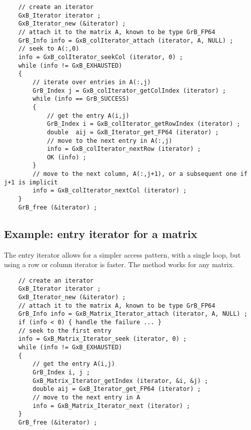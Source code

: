 \documentclass[12pt]{article}
\begin{document}
    {\footnotesize
    \begin{verbatim}
    // create an iterator
    GxB_Iterator iterator ;
    GxB_Iterator_new (&iterator) ;
    // attach it to the matrix A, known to be type GrB_FP64
    GrB_Info info = GxB_colIterator_attach (iterator, A, NULL) ;
    // seek to A(:,0)
    info = GxB_colIterator_seekCol (iterator, 0) ;
    while (info != GxB_EXHAUSTED)
    {
        // iterate over entries in A(:,j)
        GrB_Index j = GxB_colIterator_getColIndex (iterator) ;
        while (info == GrB_SUCCESS)
        {
            // get the entry A(i,j)
            GrB_Index i = GxB_colIterator_getRowIndex (iterator) ;
            double  aij = GxB_Iterator_get_FP64 (iterator) ;
            // move to the next entry in A(:,j)
            info = GxB_colIterator_nextRow (iterator) ;
            OK (info) ;
        }
        // move to the next column, A(:,j+1), or a subsequent one if j+1 is implicit
        info = GxB_colIterator_nextCol (iterator) ;
    }
    GrB_free (&iterator) ; \end{verbatim}}

\newpage
\subsection{Example: entry iterator for a matrix}

The entry iterator allows for a simpler access pattern, with a single loop, but
using a row or column iterator is faster.  The method works for any matrix.

    {\footnotesize
    \begin{verbatim}
    // create an iterator
    GxB_Iterator iterator ;
    GxB_Iterator_new (&iterator) ;
    // attach it to the matrix A, known to be type GrB_FP64
    GrB_Info info = GxB_Matrix_Iterator_attach (iterator, A, NULL) ;
    if (info < 0) { handle the failure ... }
    // seek to the first entry
    info = GxB_Matrix_Iterator_seek (iterator, 0) ;
    while (info != GxB_EXHAUSTED)
    {
        // get the entry A(i,j)
        GrB_Index i, j ;
        GxB_Matrix_Iterator_getIndex (iterator, &i, &j) ;
        double aij = GxB_Iterator_get_FP64 (iterator) ;
        // move to the next entry in A
        info = GxB_Matrix_Iterator_next (iterator) ;
    }
    GrB_free (&iterator) ; \end{verbatim}}
\end{document}
